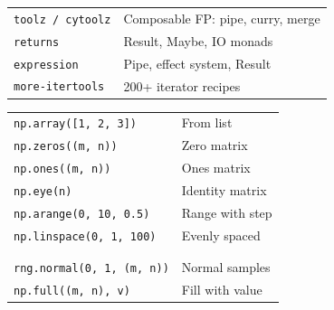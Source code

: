 \documentclass[10pt]{extarticle}
\begin{document}
\begin{multicols}{2}
\begin{tabularx}{\linewidth}{@{}l@{\enspace}Y@{}}
\texttt{toolz / cytoolz}     & Composable FP: pipe, curry, merge \\
\texttt{returns}              & Result, Maybe, IO monads \\
\texttt{expression}           & Pipe, effect system, Result \\
\texttt{more-itertools}       & 200+ iterator recipes \\
\end{tabularx}

\end{multicols}

\newpage


\begin{multicols}{2}

\begin{tabularx}{\linewidth}{@{}>{\raggedright\arraybackslash}p{0.62\linewidth}@{\enspace}Y@{}}
\texttt{np.array([1, 2, 3])}        & From list \\
\texttt{np.zeros((m, n))}           & Zero matrix \\
\texttt{np.ones((m, n))}            & Ones matrix \\
\texttt{np.eye(n)}                   & Identity matrix \\
\texttt{np.arange(0, 10, 0.5)}      & Range with step \\
\texttt{np.linspace(0, 1, 100)}     & Evenly spaced \\
 & \\
 \\
\texttt{rng.normal(0, 1, (m, n))}   & Normal samples \\
\texttt{np.full((m, n), v)}         & Fill with value \\
\end{tabularx}


\end{multicols}
\end{document}
